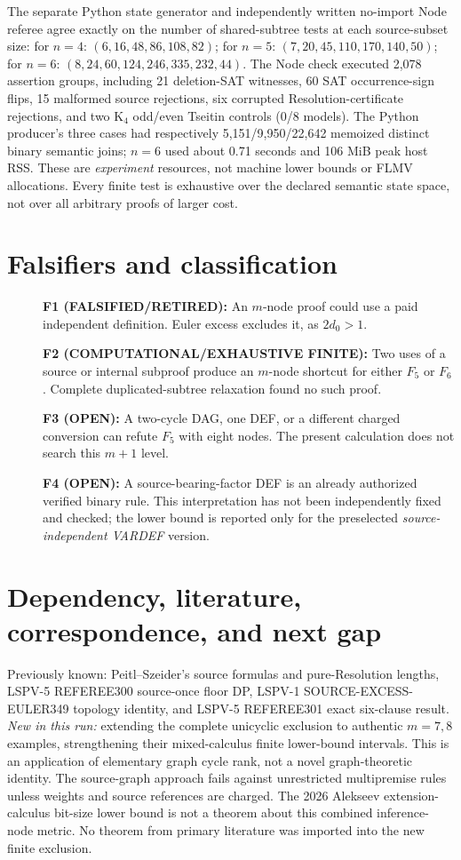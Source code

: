 \documentclass[11pt]{article}
\begin{document}
The separate Python state generator and independently written no-import Node referee agree exactly on the number of shared-subtree tests at each source-subset size: for $n=4$: $(6,16,48,86,108,82)$; for $n=5$: $(7,20,45,110,170,140,50)$; for $n=6$: $(8,24,60,124,246,335,232,44)$. The Node check executed 2,078 assertion groups, including 21 deletion-SAT witnesses, 60 SAT occurrence-sign flips, 15 malformed source rejections, six corrupted Resolution-certificate rejections, and two K$_4$ odd/even Tseitin controls (0/8 models). The Python producer's three cases had respectively 5,151/9,950/22,642 memoized distinct binary semantic joins; $n=6$ used about 0.71 seconds and 106 MiB peak host RSS. These are \emph{experiment} resources, not machine lower bounds or FLMV allocations. Every finite test is exhaustive over the declared semantic state space, not over all arbitrary proofs of larger cost.

\section*{Falsifiers and classification}
\begin{description}
\item[] \textbf{F1 (FALSIFIED/RETIRED):} An $m$-node proof could use a paid independent definition. Euler excess excludes it, as $2d_0>1$.
\item[] \textbf{F2 (COMPUTATIONAL/EXHAUSTIVE FINITE):} Two uses of a source or internal subproof produce an $m$-node shortcut for either $F_5$ or $F_6$. Complete duplicated-subtree relaxation found no such proof.
\item[] \textbf{F3 (OPEN):} A two-cycle DAG, one DEF, or a different charged conversion can refute $F_5$ with eight nodes. The present calculation does not search this $m+1$ level.
\item[] \textbf{F4 (OPEN):} A source-bearing-factor DEF is an already authorized verified binary rule. This interpretation has not been independently fixed and checked; the lower bound is reported only for the preselected \emph{source-independent VARDEF} version.
\end{description}

\section*{Dependency, literature, correspondence, and next gap}
Previously known: Peitl--Szeider's source formulas and pure-Resolution lengths, LSPV-5 REFEREE300 source-once floor DP, LSPV-1 SOURCE-EXCESS-EULER349 topology identity, and LSPV-5 REFEREE301 exact six-clause result. \emph{New in this run:} extending the complete unicyclic exclusion to authentic $m=7,8$ examples, strengthening their mixed-calculus finite lower-bound intervals. This is an application of elementary graph cycle rank, not a novel graph-theoretic identity. The source-graph approach fails against unrestricted multipremise rules unless weights and source references are charged. The 2026 Alekseev extension-calculus bit-size lower bound is not a theorem about this combined inference-node metric. No theorem from primary literature was imported into the new finite exclusion.
\end{document}
